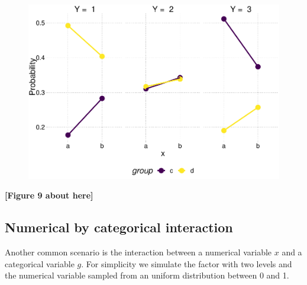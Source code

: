 \documentclass[
  man,floatsintext]{apa6}
\begin{document}
\scriptsize

\begin{figure}

{\centering \includegraphics{paper-new_files/figure-latex/fig-effects-2-by-2-interaction-1} 

}

\caption{ }\label{fig:fig-effects-2-by-2-interaction}
\end{figure}

\begin{center}\textbf{[Figure 9 about here]} \end{center}

\normalsize

\subsection{Numerical by categorical interaction}\label{numerical-by-categorical-interaction}

Another common scenario is the interaction between a numerical variable \(x\) and a categorical variable \(g\). For simplicity we simulate the factor with two levels and the numerical variable sampled from an uniform distribution between 0 and 1.

\scriptsize
\end{document}
